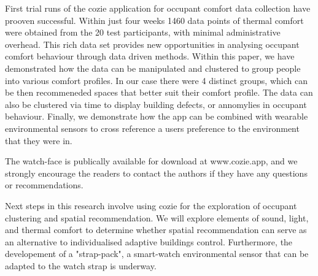 
First trial runs of the cozie application for occupant comfort data collection have prooven successful. Within just four weeks 1460 data points of thermal comfort were obtained from the 20 test participants, with minimal administrative overhead. This rich data set provides new opportunities in analysing occupant comfort behaviour through data driven methods. Within this paper, we have demonstrated how the data can be manipulated and clustered to group people into various comfort profiles. In our case there were 4 distinct groups, which can be then recommeneded spaces that better suit their comfort profile. The data can also be clustered via time to display building defects, or annomylies in occupant behaviour. Finally, we demonstrate how the app can be combined with wearable environmental sensors to cross reference a users preference to the environment that they were in.

The watch-face is publically available for download at www.cozie.app, and we strongly encourage the readers to contact the authors if they have any questions or recommendations.

Next steps in this research involve using cozie for the exploration of occupant clustering and spatial recommendation. We will explore elements of sound, light, and thermal comfort to determine whether spatial recommendation can serve as an alternative to individualised adaptive buildings control. Furthermore, the developement of a "strap-pack", a smart-watch environmental sensor that can be adapted to the watch strap is underway. 